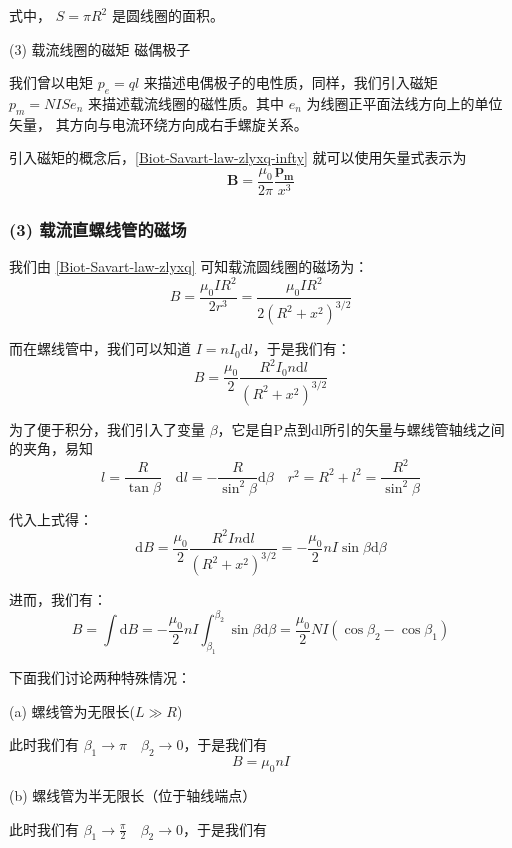 式中， $S=\pi R^{2}$ 是圆线圈的面积。

(3) 载流线圈的磁矩 磁偶极子

我们曾以电矩 $p_{e}=ql$ 来描述电偶极子的电性质，同样，我们引入磁矩
$p_{m}=NISe_{n}$ 来描述载流线圈的磁性质。其中 $e_{n}$ 为线圈正平面法线方向上的单位矢量，
其方向与电流环绕方向成右手螺旋关系。

引入磁矩的概念后，\autoref{Biot-Savart-law-zlyxq-infty} 就可以使用矢量式表示为
\begin{equation}
  \label{Biot-Savart-law-zlyxq-cj}
  \boldsymbol{B}=\frac{\mu_0}{2\pi}\frac{\boldsymbol{p_{m}}}{x^{3}}
\end{equation}

\subsubsection{(3) 载流直螺线管的磁场}

我们由 \autoref{Biot-Savart-law-zlyxq} 可知载流圆线圈的磁场为：
$$
B=\frac{\mu_0IR^2}{2r^{3}}=\frac{\mu_0IR^2}{2(R^{2}+x^{2})^{3/2}}
$$

而在螺线管中，我们可以知道 $I=nI_0\mathrm{d} l$，于是我们有：
$$
B=\frac{\mu_0}{2}\frac{R^2I_0n \mathrm{d} l}{(R^{2}+x^{2})^{3/2}}
$$

为了便于积分，我们引入了变量 $\beta$，它是自P点到dl所引的矢量与螺线管轴线之间的夹角，易知
$$
l=\frac{R}{\tan\beta}\quad\mathrm{d} l =-\frac{R}{\sin ^{2}\beta}\mathrm{d} \beta
\quad r^{2}=R^{2}+l^{2}=\frac{R^{2}}{\sin ^{2}\beta}
$$

代入上式得：
$$
\mathrm{d}B=\frac{\mu_0}{2}\frac{R^{2}In\mathrm{d}l}{(R^{2}+x^{2})^{3/2}}
=-\frac{\mu_0}{2} nI\sin \beta \mathrm{d}\beta
$$

进而，我们有：
\begin{equation}
  \label{Biot-Savart-law-zlzlxg}
  B=\int\mathrm{d}B=-\frac{\mu_0}{2}nI\int^{\beta_2}_{\beta_1}\sin \beta \mathrm{d} \beta=\frac{\mu_0}{2}NI(\cos \beta_2-\cos \beta_1)
\end{equation}

下面我们讨论两种特殊情况：

(a) 螺线管为无限长($L\gg R$)

此时我们有 $\beta_1 \to \pi\quad \beta_2 \to 0$，于是我们有
\begin{equation}
  \label{Biot-Savart-law-zlzlxg-infty}
  B=\mu_0nI
\end{equation}

(b) 螺线管为半无限长（位于轴线端点）

此时我们有 $\displaystyle \beta_1 \to \frac{\pi}{2}\quad \beta_2 \to 0$，于是我们有


